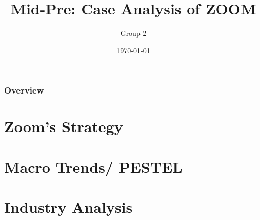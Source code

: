 \documentclass{beamer}
\title[Business Strategy]{Mid-Pre: Case Analysis of \textbf{ZOOM}} %
\author{Group 2} %
\institute[ENTR1006,Fall20] %
{
\textit{ZiyeLiu,YuweiMao,ChengShi,BoYang} %
}
\date{\today} %
\begin{document}
\begin{frame}
\titlepage %
\end{frame}

\begin{frame}
\frametitle{Overview} %
\tableofcontents %
\end{frame}


\section{Zoom's Strategy}
\section{Macro Trends/ PESTEL}
\section{Industry Analysis} %




\end{document}
